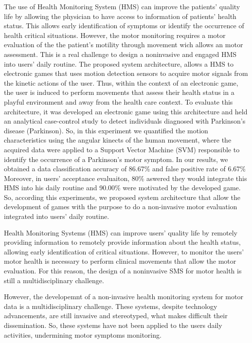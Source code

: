 The use of Health Monitoring System (HMS) can improve the patients' quality life by allowing the physician to have access to information of patients' health status. This allows early identification of symptoms or identify the occurrence of health critical situations. However, the motor monitoring requires a motor evaluation of the the patient's motility through movement wich allows an motor assessment. This is a real challenge to design a noninvasive and engaged HMS into users' daily routine.
The proposed system architecture, allows a HMS to electronic games that uses motion detection sensors to acquire motor signals from the kinetic actions of the user. Thus, within the context of an electronic game, the user is induced to perform movements that assess their health status in a playful environment and away from the health care context. To evaluate this architecture, it was developed an electronic game using this architecture and held an analytical case-control study to detect individuals diagnosed with Parkinson's disease (Parkinson). So, in this experiment we quantified the motion characteristics using the angular kinects of the human movement, where the acquired data were applied to a Support Vector Machine (SVM) responsible to identify the occurrence of a Parkinson's motor symptom. In our results, we obtained a data classification accuracy of 86.67\% and false positive rate of 6.67\% Moreover, in users' acceptance evaluaiton, 80\% aswered they would integrate this HMS into his daily routine and 90.00\% were motivated by the developed game. So, according this experiments, we proposed system architecture that allow the development of games with the purpose to do a non-invasive motor evaluation integrated into users' daily routine.




Health Monitoring Systems (HMS) can improve users' quality life by remotely providing information to remotely provide information about the health status, allowing early identification of critical situations. However, to monitor the users' motor health is necessary to perform clinical movements that allow the motor evaluation. For this reason, the design of a noninvasive SMS for motor health is still a multidisciplinary challenge.


However, the developemnt of a non-invasive health monitoring system for motor data is a multidisciplinary challenge. These systems, despite technology advancements, are still invasive and stereotyped, what makes difficult their dissemination. So, these systems have not been applied to the users daily activities, undermining motor symptoms monitoring.

